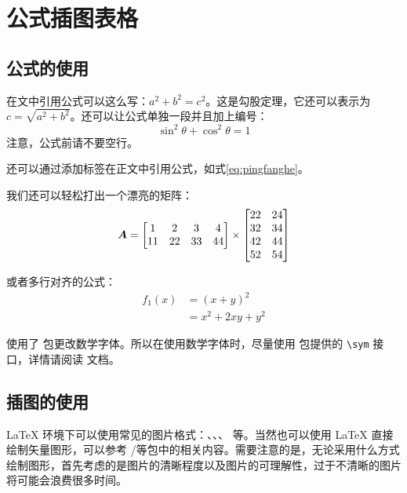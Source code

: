 
\chapter{公式插图表格}
\section{公式的使用}
在文中引用公式可以这么写：\(a^2 + b^2 = c^2\)。这是勾股定理，它还可以表示为 \(c = \sqrt{a^2 + b^2}\)。还可以让公式单独一段并且加上编号：
\begin{equation}
  \sin^2{\theta} + \cos^2{\theta} = 1 \label{eq:pingfanghe}
\end{equation}
注意，公式前请不要空行。

还可以通过添加标签在正文中引用公式，如式\eqref{eq:pingfanghe}。

我们还可以轻松打出一个漂亮的矩阵：
\begin{equation}
  \vb*{A} =
  \begin{bmatrix}
    1  & 2  & 3  & 4  \\
    11 & 22 & 33 & 44 \\
  \end{bmatrix} \times
  \begin{bmatrix}
    22 & 24 \\
    32 & 34 \\
    42 & 44 \\
    52 & 54 \\
  \end{bmatrix}
\end{equation}

或者多行对齐的公式：
\begin{equation}
  \begin{aligned}
    f_1(x) & = (x + y)^2         \\
           & = x^2 + 2 x y + y^2
  \end{aligned}
\end{equation}

\begin{notice}
  \WhuThesis 使用了  包更改数学字体。所以在使用数学字体时，尽量使用  包提供的 \verb|\sym| 接口，详情请阅读  文档。
\end{notice}

\section{插图的使用}
\LaTeX{} 环境下可以使用常见的图片格式：、、、 等。当然也可以使用 \LaTeX{} 直接绘制矢量图形，可以参考 /等包中的相关内容。需要注意的是，无论采用什么方式绘制图形，首先考虑的是图片的清晰程度以及图片的可理解性，过于不清晰的图片将可能会浪费很多时间。

